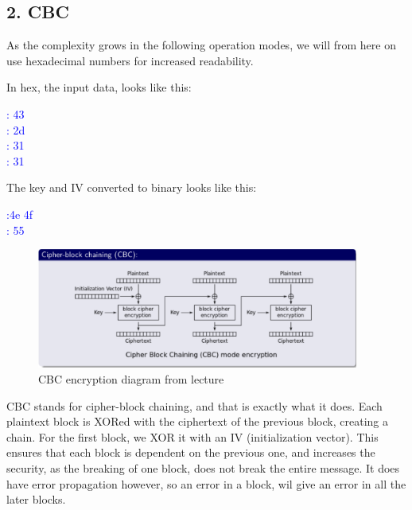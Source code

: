 \documentclass{article}
\begin{document}
\newpage
\subsection{2. CBC}

As the complexity grows in the following operation modes, we will from here on use hexadecimal numbers for increased readability.

In hex, the  input data, looks like this:
\begin{tcolorbox}
\begin{center}
\textcolor{blue}{
: 43\\
: 2d\\
: 31\\
: 31}
\end{center}
\end{tcolorbox}

The key and IV converted to binary looks like this: 
\begin{tcolorbox}
\begin{center}
\textcolor{blue}{
:\qquad4e 4f\\
: 55}
\end{center}
\end{tcolorbox}


\begin{figure}[H]
 \centering
  \includegraphics[width=300pt]{img/cbcLecture.png}
 \caption{CBC encryption diagram from lecture}
 \end{figure}

CBC stands for cipher-block chaining, and that is exactly what it does. Each plaintext block is XORed with the ciphertext of the previous block, creating a chain. For the first block, we XOR it with an IV (initialization vector). This ensures that each block is dependent on the previous one, and increases the security, as the breaking of one block, does not break the entire message. It does have error propagation however, so an error in a block, wil give an error in all the later blocks. 
\end{document}
